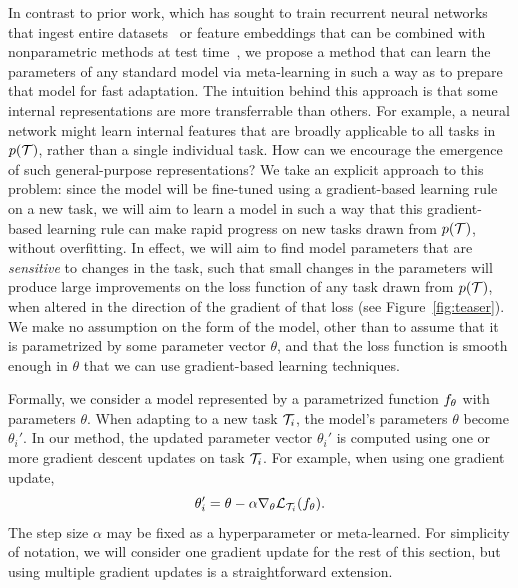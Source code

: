\documentclass{article}
\begin{document}
In contrast to prior work, which has sought to train recurrent neural networks that ingest entire datasets~\cite{mann,rl2} or feature embeddings that can be combined with nonparametric methods at test time~\cite{matchingnets,siameseoneshot}, we propose a method that can learn the parameters of any standard model via meta-learning in such a way as to prepare that model for fast adaptation. The intuition behind this approach is that some internal representations are more transferrable than others. For example, a neural network might learn internal features that are broadly applicable to all tasks in $p(\mathcal{T})$, rather than a single individual task. How can we encourage the emergence of such general-purpose representations? We take an explicit approach to this problem: since the model will be fine-tuned using a gradient-based learning rule on a new task, we will aim to learn a model in such a way that this gradient-based learning rule can make rapid progress on new tasks drawn from $p(\mathcal{T})$, without overfitting. In effect, we will aim to find model parameters that are \emph{sensitive} to changes in the task, such that small changes in the parameters will produce large improvements on the loss function of any task drawn from $p(\mathcal{T})$, when altered in the direction of the gradient of that loss (see Figure~\ref{fig:teaser}). We make no assumption on the form of the model, other than to assume that it is parametrized by some parameter vector $\theta$, and that the loss function is smooth enough in $\theta$ that we can use gradient-based learning techniques.


Formally, we consider a model
represented by a parametrized function $f_\theta$
with parameters $\theta$.
When adapting to a new task $\mathcal{T}_i$, the model's parameters $\theta$ become $\theta_i'$.
In our method, the updated parameter vector $\theta_i'$ is computed using one or more gradient descent updates on task $\mathcal{T}_i$.
For example, when using one gradient update,
\vspace{-0.15cm}
$$
\vspace{-0.15cm}
\theta_i'=\theta-\alpha \nabla_\theta  \lossi(  \learner_\theta ).
$$
The step size $\alpha$ may be fixed as a hyperparameter or meta-learned.
For simplicity of notation, we will consider one gradient update for the rest of this section, but using multiple gradient updates is a straightforward extension.
\end{document}
